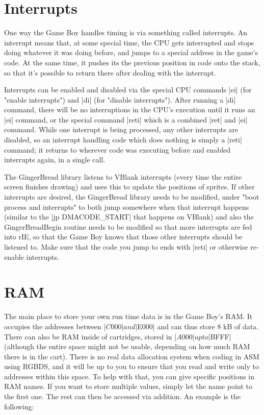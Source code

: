 \documentclass[11pt]{book}
\begin{document}
\section{Interrupts} 
\label{weinterruptthisprogramme}
One way the Game Boy handles timing is via something called interrupts. An interrupt means that, at some special time, the CPU gets interrupted and stops doing whatever it was doing before, and jumps to a special address in the game's code. At the same time, it pushes its the previous position in code onto the stack, so that it's possible to return there after dealing with the interrupt. 

Interrupts can be enabled and disabled via the special CPU commands |ei| (for "enable interrupts") and |di| (for "disable interrupts"). After running a |di| command, there will be no interruptions in the CPU's execution until it runs an |ei| command, or the special command |reti| which is a combined |ret| and |ei| command. While one interrupt is being processed, any other interrupts are disabled, so an interrupt handling code which does nothing is simply a |reti| command; it returns to wherever code was executing before and enabled interrupts again, in a single call. 

The GingerBread library listens to VBlank interrupts (every time the entire screen finishes drawing) and uses this to update the positions of sprites. If other interrupts are desired, the GingerBread library needs to be modified, under "boot process and interrupts" to both jump somewhere when that interrupt happens (similar to the |jp DMACODE_START| that happens on VBlank) and also the GingerBreadBegin routine needs to be modified so that more interrupts are fed into rIE, so that the Game Boy knows that those other interrupts should be listened to. Make sure that the code you jump to ends with |reti| or otherwise re-enable interrupts.

\section{RAM}
\label{ram}
The main place to store your own run time data is in the Game Boy’s RAM. It occupies the addresses between |$C000| and |$E000| and can thus store 8 kB of data. There can also be RAM inside of cartridges, stored in |$A000| up to |$BFFF| (although the entire space might not be usable, depending on how much RAM there is in the cart). There is no real data allocation system when coding in ASM using RGBDS, and it will be up to you to ensure that you read and write only to addresses within this space. To help with that, you can give specific positions in RAM names. If you want to store multiple values, simply let the name point to the first one. The rest can then be accessed via addition. An example is the following:
\end{document}
